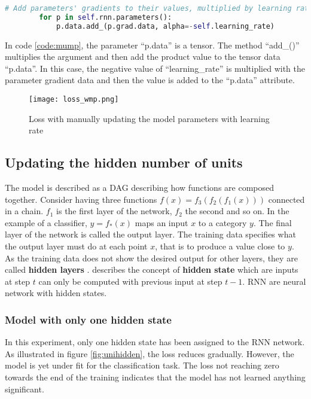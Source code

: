 \begin{lstlisting}[language=Python,caption={Manual gradient updation}, label={code:mump}]
    # Add parameters' gradients to their values, multiplied by learning rate
        for p in self.rnn.parameters():
            p.data.add_(p.grad.data, alpha=-self.learning_rate)
\end{lstlisting}

In code \ref{code:mump}, the parameter ``p.data'' is a tensor. The method  ``add\_()'' multiplies the argument and then add the product value to the tensor data ``p.data''. In this case, the negative value of ``learning\_rate'' is multiplied with the parameter gradient data and then the value is added to the ``p.data'' attribute.

\begin{figure}[H]
    \centering    
    \texttt{[image: loss\_wmp.png]}
    \caption{Loss with manually updating the model parameters with learning rate}
    \label{fig:wmp}
\end{figure}


\subsection*{Updating the hidden number of units}

The model is described as a \acl{DAG} describing how functions are composed together. Consider having three functions $f(x) = f_3(f_2(f_1(x)))$ connected in a chain. $f_1$ is the first layer of the network, $f_2$ the second and so on. In the example of a classifier, $y=f_*(x)$ maps an input $ x $ to a category $ y $. The final layer of the network is called the output layer. The training data specifies what the output layer must do at each point $x$, that is to produce a value close to $y$. As the training data does not show the desired output for other layers, they are called \textbf{hidden layers}  \parencite[Chapter 3]{Goodfellow-et-al-2016}.  \parencite{zhang2021dive} describes the concept of \textbf{hidden state} which are inputs at step $t$ can only be computed with previous input at step $ t-1 $. \acf{RNN} are neural network with hidden states.

\subsubsection*{Model with only one hidden state}
In this experiment, only one hidden state has been assigned to the \acs{RNN} network. As illustrated in figure \ref{fig:unihidden}, the loss reduces gradually. However, the model is yet under fit for the classification task. The loss not reaching zero towards the end of the training indicates that the model has not learned anything significant.

